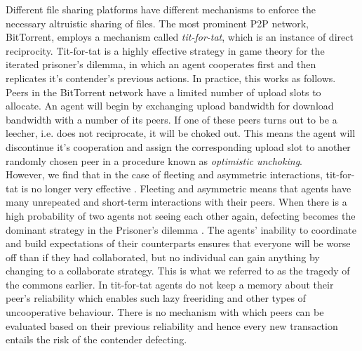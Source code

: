 \documentclass[11pt,a4paper]{article}
\theoremstyle{definition}
\theoremstyle{theorem}
\begin{document}
\noindent{}Different file sharing platforms have different mechanisms to enforce the necessary altruistic sharing of files. The most prominent P2P network, BitTorrent, employs a mechanism called {\it tit-for-tat}, which is an instance of direct reciprocity. Tit-for-tat is a highly effective strategy in game theory for the iterated prisoner's dilemma, in which an agent cooperates first and then replicates it's contender's previous actions. In practice, this works as follows. Peers in the BitTorrent network have a limited number of upload slots to allocate. An agent will begin by exchanging upload bandwidth for download bandwidth with a number of its peers. If one of these peers turns out to be a leecher, i.e. does not reciprocate, it will be choked out. This means the agent will discontinue it's cooperation and assign the corresponding upload slot to another randomly chosen peer in a procedure known as {\it optimistic unchoking}. \vspace{1em}\\

\noindent{}However, we find that in the case of fleeting and asymmetric interactions, tit-for-tat is no longer very effective \cite{A Simple Rule for the Evolution of Cooperation on Graphs and Social Networks}. Fleeting and asymmetric means that agents have many unrepeated and short-term interactions with their peers. When there is a high probability of two agents not seeing each other again, defecting becomes the dominant strategy in the Prisoner's dilemma \cite{An optimal strategy to solve the prisoner's dilemma}. The agents' inability to coordinate and build expectations of their counterparts ensures that everyone will be worse off than if they had collaborated, but no individual can gain anything by changing to a collaborate strategy. This is what we referred to as the tragedy of the commons earlier. In tit-for-tat agents do not keep a memory about their peer’s reliability which enables such lazy freeriding and other types of uncooperative behaviour. There is no mechanism with which peers can be evaluated based on their previous reliability and hence every new transaction entails the risk of the contender defecting. \vspace{1em}\\
\end{document}
